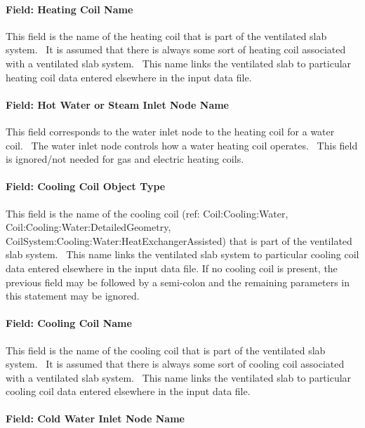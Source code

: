 \paragraph{Field: Heating Coil Name}\label{field-heating-coil-name-001}

This field is the name of the heating coil that is part of the ventilated slab system.~ It is assumed that there is always some sort of heating coil associated with a ventilated slab system.~ This name links the ventilated slab to particular heating coil data entered elsewhere in the input data file.

\paragraph{Field: Hot Water or Steam Inlet Node Name}\label{field-hot-water-or-steam-inlet-node-name}

This field corresponds to the water inlet node to the heating coil for a water coil.~ The water inlet node controls how a water heating coil operates.~ This field is ignored/not needed for gas and electric heating coils.

\paragraph{Field: Cooling Coil Object Type}\label{field-cooling-coil-object-type-001}

This field is the name of the cooling coil (ref: Coil:Cooling:Water, Coil:Cooling:Water:DetailedGeometry, CoilSystem:Cooling:Water:HeatExchangerAssisted) that is part of the ventilated slab system.~ This name links the ventilated slab system to particular cooling coil data entered elsewhere in the input data file. If no cooling coil is present, the previous field may be followed by a semi-colon and the remaining parameters in this statement may be ignored.

\paragraph{Field: Cooling Coil Name}\label{field-cooling-coil-name-001}

This field is the name of the cooling coil that is part of the ventilated slab system.~ It is assumed that there is always some sort of cooling coil associated with a ventilated slab system.~ This name links the ventilated slab to particular cooling coil data entered elsewhere in the input data file.

\paragraph{Field: Cold Water Inlet Node Name}\label{field-cold-water-inlet-node-name}

